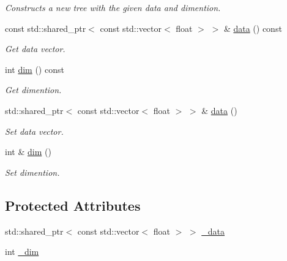 \begin{DoxyCompactItemize}
\begin{DoxyCompactList}\small\item\em Constructs a new tree with the given data and dimention. \end{DoxyCompactList}\item 
\hypertarget{classtree_1_1vp__tree_a0ac835729832f805cfde6375891f9073}{}const std\+::shared\+\_\+ptr$<$ const std\+::vector$<$ float $>$ $>$ \& \hyperlink{classtree_1_1vp__tree_a0ac835729832f805cfde6375891f9073}{data} () const \label{classtree_1_1vp__tree_a0ac835729832f805cfde6375891f9073}

\begin{DoxyCompactList}\small\item\em Get data vector. \end{DoxyCompactList}\item 
\hypertarget{classtree_1_1vp__tree_a9654dfc1b8ec7db0718f3d98a9efe5e1}{}int \hyperlink{classtree_1_1vp__tree_a9654dfc1b8ec7db0718f3d98a9efe5e1}{dim} () const \label{classtree_1_1vp__tree_a9654dfc1b8ec7db0718f3d98a9efe5e1}

\begin{DoxyCompactList}\small\item\em Get dimention. \end{DoxyCompactList}\item 
std\+::shared\+\_\+ptr$<$ const std\+::vector$<$ float $>$ $>$ \& \hyperlink{classtree_1_1vp__tree_a60bbbc0833e9f9d151639f1767ef134c}{data} ()
\begin{DoxyCompactList}\small\item\em Set data vector. \end{DoxyCompactList}\item 
int \& \hyperlink{classtree_1_1vp__tree_a5863f0152d429394c404707c5f91ecc2}{dim} ()
\begin{DoxyCompactList}\small\item\em Set dimention. \end{DoxyCompactList}\end{DoxyCompactItemize}
\subsection*{Protected Attributes}
\begin{DoxyCompactItemize}
\item 
std\+::shared\+\_\+ptr$<$ const std\+::vector$<$ float $>$ $>$ \hyperlink{classtree_1_1vp__tree_ad53d34e7a1648e2b5f88ae2c66e6a44d}{\+\_\+data}
\item 
int \hyperlink{classtree_1_1vp__tree_a1c99c8567c9aa156be0f2a77487bab74}{\+\_\+dim}
\end{DoxyCompactItemize}


